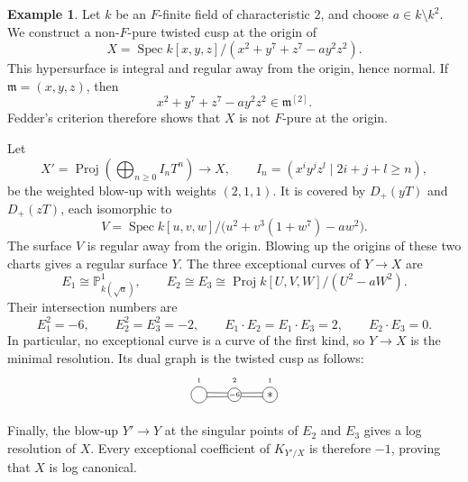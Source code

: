 \documentclass[12pt]{amsart}
\def\ge{\geqslant}
\def\Spec{\operatorname{Spec}}
\def\Proj{\operatorname{Proj}}
\newcommand{\PP}{\mathbb{P}}
\theoremstyle{plain}
\theoremstyle{definition}
\newtheorem{eg}[thm]{Example}
\theoremstyle{remark}
\newtheorem{defn and notation}[thm]{Definition and Notation}
\theoremstyle{plain}
\numberwithin{equation}{thm}
\begin{document}
\begin{eg}\label{eg:non F-pure cusp}
Let $k$ be an $F$-finite field of characteristic $2$, and choose $a\in k\setminus k^2$.
We construct a non-$F$-pure twisted cusp at the origin of
\[
X=\Spec k[x,y,z]/(x^2+y^7+z^7-ay^2z^2).
\]
This hypersurface is integral and regular away from the origin, hence normal.
If $\mathfrak m=(x,y,z)$, then
\[
x^2+y^7+z^7-ay^2z^2\in\mathfrak m^{[2]}.
\]
Fedder's criterion therefore shows that $X$ is not $F$-pure at the origin.

Let
\[
X'=\Proj\left(\bigoplus_{n\ge0}I_nT^n\right)\longrightarrow X,
\qquad I_n=(x^iy^jz^l\mid 2i+j+l\ge n),
\]
be the weighted blow-up with weights $(2,1,1)$.
It is covered by $D_+(yT)$ and $D_+(zT)$, each isomorphic to
\[
V=\Spec k[u,v,w]/\bigl(u^2+v^3(1+w^7)-aw^2\bigr).
\]
The surface $V$ is regular away from the origin.
Blowing up the origins of these two charts gives a regular surface $Y$.
The three exceptional curves of $Y\to X$ are
\[
E_1\cong\PP^1_{k(\sqrt a)},\qquad
E_2\cong E_3\cong\Proj k[U,V,W]/(U^2-aW^2).
\]
Their intersection numbers are
\[
E_1^2=-6,\qquad E_2^2=E_3^2=-2,\qquad
E_1\cdot E_2=E_1\cdot E_3=2,\qquad E_2\cdot E_3=0.
\]
In particular, no exceptional curve is a curve of the first kind, so $Y\to X$ is the minimal resolution.
Its dual graph is the twisted cusp as follows:
    \[
    \begin{tikzpicture}
    \node[draw, shape=circle, inner sep=4.5pt] (B1) at (0,0){};
    \draw[shift={(0,0.4)}] (0,0) node{\tiny $1$};
    \node[draw, shape=circle, inner sep=0.3pt] (B2) at (1,0){\tiny{$-6$}};
    \draw[shift={(0,0.4)}] (1,0) node{\tiny $2$};
    \node[draw, shape=circle, inner sep=1.8pt] (B3) at (2,0){$*$};
    \draw[shift={(0,0.4)}] (2,0) node{\tiny $1$};

    \draw (B1.15)--(B2.165);
    \draw (B1.-15)--(B2.-165);
    \draw (B2.15)--(B3.165);
    \draw (B2.-15)--(B3.-165);
    \end{tikzpicture}
    \]

Finally, the blow-up $Y'\to Y$ at the singular points of $E_2$ and $E_3$ gives a log resolution of $X$. 
Every exceptional coefficient of $K_{Y'/X}$ is therefore $-1$, proving that $X$ is log canonical.


\end{eg}
\end{document}
